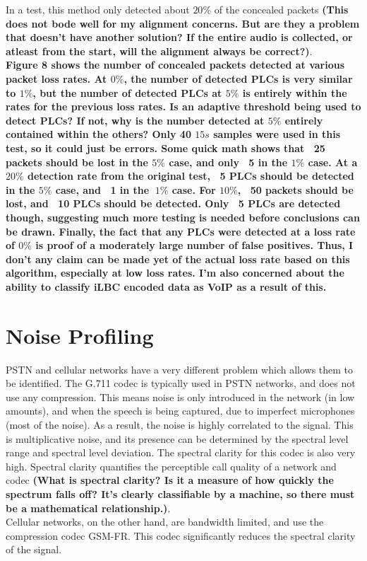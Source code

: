 \documentclass{article}
\begin{document}
In a test, this method only detected about $20\%$ of the concealed packets
{\bf(This does not bode well for my alignment concerns.
  But are they a problem that doesn't have another solution?
  If the entire audio is collected, or atleast from the start,
  will the alignment always be correct?)}.\\
{\bf Figure 8 shows the number of concealed packets detected at various packet loss rates.
  At $0\%$, the number of detected PLCs is very similar to $1\%$,
  but the number of detected PLCs at $5\%$ is entirely within the rates for the previous loss rates.
  Is an adaptive threshold being used to detect PLCs?
  If not, why is the number detected at $5\%$ entirely contained within the others?
  Only 40 $15 s$ samples were used in this test, so it could just be errors.
  Some quick math shows that ~25 packets should be lost in the $5\%$ case,
  and only ~5 in the $1\%$ case.
  At a $20\%$ detection rate from the original test,
  ~5 PLCs should be detected in the $5\%$ case, and ~1 in the $~1\%$ case.
  For $10\%$, ~50 packets should be lost, and ~10 PLCs should be detected.
  Only ~5 PLCs are detected though, suggesting much more testing is needed before conclusions can be drawn.
  Finally, the fact that any PLCs were detected at a loss rate of $0\%$
  is proof of a moderately large number of false positives.
  Thus, I don't any claim can be made yet of the actual loss rate based on this algorithm,
  especially at low loss rates.
  I'm also concerned about the ability to classify iLBC encoded data as VoIP as a result of this.}
\section{Noise Profiling}
PSTN and cellular networks have a very different problem which allows them to be identified.
The G.711 codec is typically used in PSTN networks, and does not use any compression.
This means noise is only introduced in the network (in low amounts),
and when the speech is being captured, due to imperfect microphones (most of the noise).
As a result, the noise is highly correlated to the signal.
This is multiplicative noise,
and its presence can be determined by the spectral level range and spectral level deviation.
The spectral clarity for this codec is also very high.
Spectral clarity quantifies the perceptible call quality of a network and codec
{\bf(What is spectral clarity?
  Is it a measure of how quickly the spectrum falls off?
  It's clearly classifiable by a machine, so there must be a mathematical relationship.)}.\\
Cellular networks, on the other hand, are bandwidth limited,
and use the compression codec GSM-FR.
This codec significantly reduces the spectral clarity of the signal.
\end{document}
